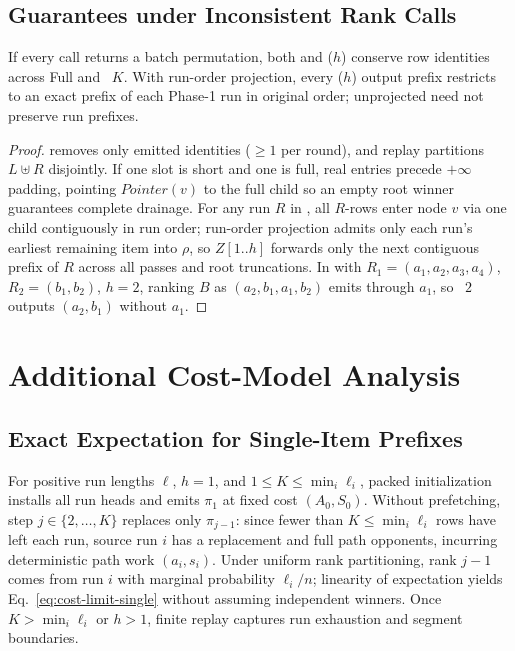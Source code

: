 \subsection{Guarantees under Inconsistent Rank Calls}
\label{app:proof-inconsistent}

\begin{proposition}
\label{prop:inconsistent}
If every call returns a batch permutation, both \SW{} and \LT($h$) conserve row identities across Full and \LIMIT~$K$. With run-order projection, every \LT($h$) output prefix restricts to an exact prefix of each Phase-1 run in original order; unprojected \SW{} need not preserve run prefixes.
\end{proposition}
\begin{proof}
\SW{} removes only emitted identities ($\ge 1$ per round), and \LT{} replay partitions $L \uplus R$ disjointly. If one \LT{} slot is short and one is full, real entries precede $+\infty$ padding, pointing $\mathit{Pointer}(v)$ to the full child so an empty root winner guarantees complete drainage. For any run $R$ in \LT, all $R$-rows enter node $v$ via one child contiguously in run order; run-order projection admits only each run's earliest remaining item into $\rho$, so $Z[1..h]$ forwards only the next contiguous prefix of $R$ across all passes and root truncations. In \SW{} with $R_1=(a_1,a_2,a_3,a_4)$, $R_2=(b_1,b_2)$, $h{=}2$, ranking $B$ as $(a_2,b_1,a_1,b_2)$ emits through $a_1$, so \LIMIT~$2$ outputs $(a_2,b_1)$ without $a_1$.
\end{proof}

\section{Additional Cost-Model Analysis}
\label{app:cost-results}

\subsection{Exact Expectation for Single-Item \LT{} Prefixes}
\label{app:cost-exact}

For positive run lengths $\boldsymbol{\ell}$, $h{=}1$, and $1 \le K \le \min_i \ell_i$, packed initialization installs all run heads and emits $\pi_1$ at fixed cost $(A_0, S_0)$. Without prefetching, step $j \in \{2,\dots,K\}$ replaces only $\pi_{j-1}$: since fewer than $K \le \min_i \ell_i$ rows have left each run, source run $i$ has a replacement and full path opponents, incurring deterministic path work $(a_i, s_i)$. Under uniform rank partitioning, rank $j{-}1$ comes from run $i$ with marginal probability $\ell_i / n$; linearity of expectation yields Eq.~\eqref{eq:cost-limit-single} without assuming independent winners. Once $K > \min_i \ell_i$ or $h > 1$, finite replay captures run exhaustion and segment boundaries.

